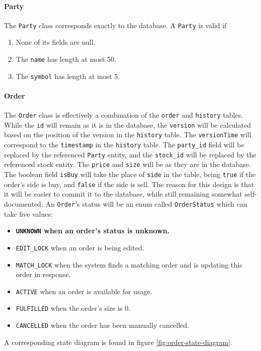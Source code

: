 \documentclass{article}
\begin{document}
 
\paragraph{Party} The \texttt{Party} class corresponds exactly to the database. A \texttt{Party} is valid if 
\begin{enumerate}
    \item None of its fields are null.
    \item The \texttt{name} has length at most 50.
    \item The \texttt{symbol} has length at most 5.
\end{enumerate}


\paragraph{Order} The \texttt{Order} class is effectively a combination of the \texttt{order} and \texttt{history} tables. While the \texttt{id} will remain as it is in the database, the \texttt{version} will be calculated based on the position of the version in the \texttt{history} table. The \texttt{versionTime} will correspond to the \texttt{timestamp} in the \texttt{history} table. The \texttt{party\_id} field will be replaced by the referenced \texttt{Party} entity, and the \texttt{stock\_id} will be replaced by the referenced stock entity. The \texttt{price} and \texttt{size} will be as they are in the database. The boolean field \texttt{isBuy} will take the place of \texttt{side} in the table, being \texttt{true} if the order's side is buy, and \texttt{false} if the side is sell. The reason for this design is that it will be easier to commit it to the database, while still remaining somewhat self-documented. An \texttt{Order}'s status will be an enum called \texttt{OrderStatus} which can take five values:

\begin{itemize}
    \item \textbf{\texttt{UNKNOWN} when an order's status is unknown.}
    \item \texttt{EDIT\_LOCK} when an order is being edited.
    \item \texttt{MATCH\_LOCK} when the system finds a matching order and is updating this order in response.
    \item \texttt{ACTIVE} when an order is available for usage.
    \item \texttt{FULFILLED} when the order's size is 0.
    \item \texttt{CANCELLED} when the order has been manually cancelled.
\end{itemize} 
A corresponding state diagram is found in figure \ref{fig:order-state-diagram}.
\end{document}
